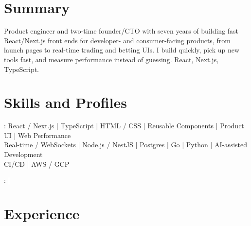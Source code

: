 \documentclass[print]{jack-resume}
\begin{document}
\pagecolor{darkmodeBackground}


\begin{minipage}[t][1cm][t]{.03\textwidth}
    \hfill
\end{minipage}

\section{Summary}
Product engineer and two-time founder/CTO with seven years of building fast React/Next.js front ends for developer- and consumer-facing products, from launch pages to real-time trading and betting UIs. I build quickly, pick up new tools fast, and measure performance instead of guessing. React, Next.js, TypeScript.
\sectionsep

\section{Skills and Profiles}
:
React / Next.js \hfill | \hfill
TypeScript \hfill | \hfill
HTML / CSS \hfill | \hfill
Reusable Components \hfill | \hfill
Product UI \hfill | \hfill
Web Performance \\
\hspace{1.0cm} Real-time / WebSockets \hfill | \hfill
Node.js / NestJS \hfill | \hfill
Postgres \hfill | \hfill
Go \hfill | \hfill
Python \hfill | \hfill
AI-assisted Development \\
\hspace{1.0cm} CI/CD \hfill | \hfill
AWS / GCP \\

\raggedright{
    :
      \href{https://www.linkedin.com/in/jack-sturtevant/}{ \ExternalLink} |
     \href{https://github.com/jacksturt}{ \ExternalLink}}

\section{Experience}
\end{document}
